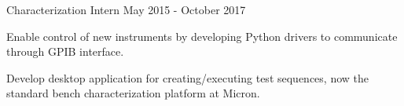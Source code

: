 \begin{cventries}
  \cventry
    {Characterization Intern} %
    {} %
    {} %
    {May 2015 - October 2017} %
    {
      \begin{cvitems} %
        \item {Enable control of new instruments by developing Python drivers to communicate through GPIB interface.}
        \item {Develop desktop application for creating/executing test sequences, now the standard bench characterization platform at Micron.}
      \end{cvitems}
    }
\end{cventries}
